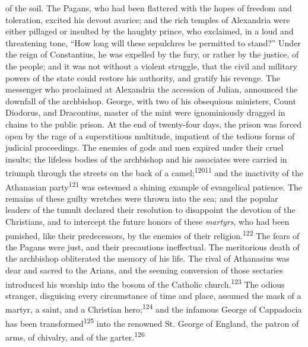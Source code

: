 of the soil. The Pagans, who had been flattered with the hopes of
freedom and toleration, excited his devout avarice; and the rich
temples of Alexandria were either pillaged or insulted by the
haughty prince, who exclaimed, in a loud and threatening tone,
“How long will these sepulchres be permitted to stand?” Under the
reign of Constantius, he was expelled by the fury, or rather by
the justice, of the people; and it was not without a violent
struggle, that the civil and military powers of the state could
restore his authority, and gratify his revenge. The messenger who
proclaimed at Alexandria the accession of Julian, announced the
downfall of the archbishop. George, with two of his obsequious
ministers, Count Diodorus, and Dracontius, master of the mint
were ignominiously dragged in chains to the public prison. At the
end of twenty-four days, the prison was forced open by the rage
of a superstitious multitude, impatient of the tedious forms of
judicial proceedings. The enemies of gods and men expired under
their cruel insults; the lifeless bodies of the archbishop and
his associates were carried in triumph through the streets on the
back of a camel;\textsuperscript{12011} and the inactivity of the Athanasian party\textsuperscript{121}
was esteemed a shining example of evangelical patience. The
remains of these guilty wretches were thrown into the sea; and
the popular leaders of the tumult declared their resolution to
disappoint the devotion of the Christians, and to intercept the
future honors of these \textit{martyrs}, who had been punished, like
their predecessors, by the enemies of their religion.\textsuperscript{122} The
fears of the Pagans were just, and their precautions ineffectual.
The meritorious death of the archbishop obliterated the memory of
his life. The rival of Athanasius was dear and sacred to the
Arians, and the seeming conversion of those sectaries introduced
his worship into the bosom of the Catholic church.\textsuperscript{123} The odious
stranger, disguising every circumstance of time and place,
assumed the mask of a martyr, a saint, and a Christian hero;\textsuperscript{124}
and the infamous George of Cappadocia has been transformed\textsuperscript{125}
into the renowned St. George of England, the patron of arms, of
chivalry, and of the garter.\textsuperscript{126}



